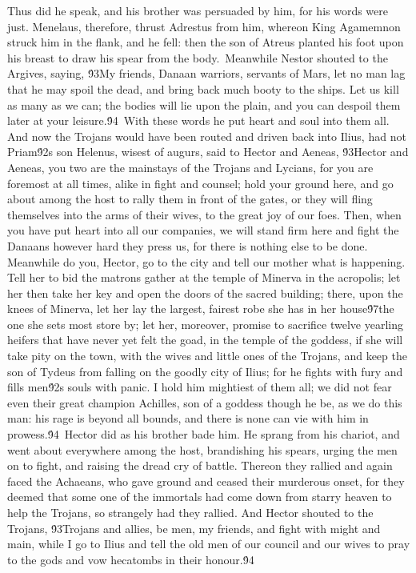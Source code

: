 {Thus did he speak, and his brother was persuaded by him, for his words were just. Menelaus, therefore, thrust Adrestus from him, whereon King Agamemnon struck him in the flank, and he fell: then the son of Atreus planted his foot upon his breast to draw his spear from the body.\
Meanwhile Nestor shouted to the Argives, saying, \'93My friends, Danaan warriors, servants of Mars, let no man lag that he may spoil the dead, and bring back much booty to the ships. Let us kill as many as we can; the bodies will lie upon the plain, and you can despoil them later at your leisure.\'94\
With these words he put heart and soul into them all. And now the Trojans would have been routed and driven back into Ilius, had not Priam\'92s son Helenus, wisest of augurs, said to Hector and Aeneas, \'93Hector and Aeneas, you two are the mainstays of the Trojans and Lycians, for you are foremost at all times, alike in fight and counsel; hold your ground here, and go about among the host to rally them in front of the gates, or they will fling themselves into the arms of their wives, to the great joy of our foes. Then, when you have put heart into all our companies, we will stand firm here and fight the Danaans however hard they press us, for there is nothing else to be done. Meanwhile do you, Hector, go to the city and tell our mother what is happening. Tell her to bid the matrons gather at the temple of Minerva in the acropolis; let her then take her key and open the doors of the sacred building; there, upon the knees of Minerva, let her lay the largest, fairest robe she has in her house\'97the one she sets most store by; let her, moreover, promise to sacrifice twelve yearling heifers that have never yet felt the goad, in the temple of the goddess, if she will take pity on the town, with the wives and little ones of the Trojans, and keep the son of Tydeus from falling on the goodly city of Ilius; for he fights with fury and fills men\'92s souls with panic. I hold him mightiest of them all; we did not fear even their great champion Achilles, son of a goddess though he be, as we do this man: his rage is beyond all bounds, and there is none can vie with him in prowess.\'94\
Hector did as his brother bade him. He sprang from his chariot, and went about everywhere among the host, brandishing his spears, urging the men on to fight, and raising the dread cry of battle. Thereon they rallied and again faced the Achaeans, who gave ground and ceased their murderous onset, for they deemed that some one of the immortals had come down from starry heaven to help the Trojans, so strangely had they rallied. And Hector shouted to the Trojans, \'93Trojans and allies, be men, my friends, and fight with might and main, while I go to Ilius and tell the old men of our council and our wives to pray to the gods and vow hecatombs in their honour.\'94\
}
